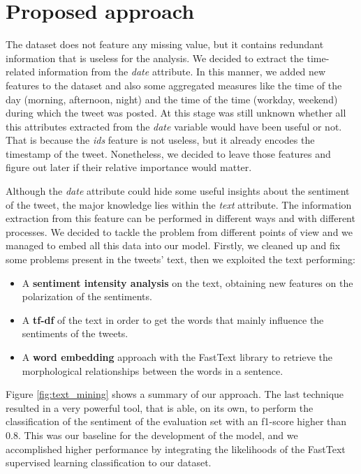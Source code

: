 \documentclass[conference]{IEEEtran}
\begin{document}
\section{Proposed approach}\label{sec:approach}
The dataset does not feature any missing value, but it contains redundant information that is useless for the analysis. We decided to extract the time-related information from the \textit{date} attribute. In this manner, we added new features to the dataset and also some aggregated measures like the time of the day (morning, afternoon, night) and the time of the time (workday, weekend) during which the tweet was posted. At this stage was still unknown whether all this attributes extracted from the \textit{date} variable would have been useful or not. That is because the \textit{ids} feature is not useless, but it already encodes the timestamp of the tweet. Nonetheless, we decided to leave those features and figure out later if their relative importance would matter.

Although the \textit{date} attribute could hide some useful insights about the sentiment of the tweet, the major knowledge lies within the \textit{text} attribute. The information extraction from this feature can be performed in different ways and with different processes. We decided to tackle the problem from different points of view and we managed to embed all this data into our model. Firstly, we cleaned up and fix some problems present in the tweets' text, then we exploited the text performing:
\begin{itemize}
    \item A \textbf{sentiment intensity analysis}\cite{} on the text, obtaining new features on the polarization of the sentiments.
    \item A \textbf{tf-df}\cite{} of the text in order to get the words that mainly influence the sentiments of the tweets.
    \item A \textbf{word embedding}\cite{} approach with the FastText\cite{} library to retrieve the morphological relationships between the words in a sentence.
\end{itemize}
Figure \ref{fig:text_mining} shows a summary of our approach.
The last technique resulted in a very powerful tool, that is able, on its own, to perform the classification of the sentiment of the evaluation set with an f1-score\cite{f1} higher than 0.8. This was our baseline for the development of the model, and we accomplished higher performance by integrating the likelihoods of the FastText supervised learning classification to our dataset. 
\end{document}
